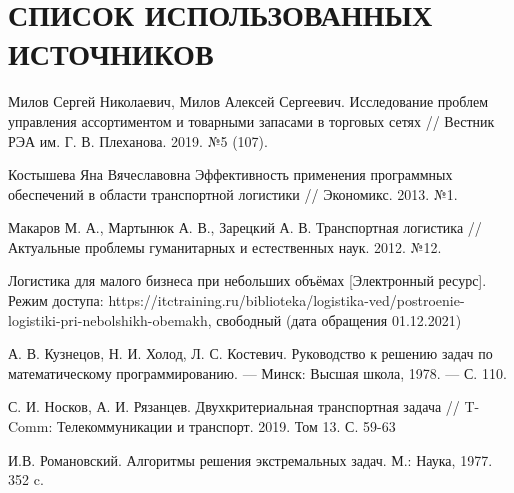 \section*{СПИСОК ИСПОЛЬЗОВАННЫХ ИСТОЧНИКОВ}

\begingroup
\renewcommand{\section}[2]{}
\begin{thebibliography}{}
	 Милов Сергей Николаевич, Милов Алексей Сергеевич. Исследование проблем управления ассортиментом и товарными запасами в торговых сетях // Вестник РЭА им. Г. В. Плеханова. 2019. №5 (107).
	
	 Костышева Яна Вячеславовна Эффективность применения программных обеспечений в области транспортной логистики // Экономикс. 2013. №1.
	
	 Макаров М. А., Мартынюк А. В., Зарецкий А. В. Транспортная логистика // Актуальные проблемы гуманитарных и естественных наук. 2012. №12.
	
	 Логистика для малого бизнеса при небольших объёмах [Электронный ресурс]. Режим доступа: https://itctraining.ru/biblioteka/logistika-ved/postroenie-logistiki-pri-nebolshikh-obemakh, свободный (дата обращения 01.12.2021)
	
	 А. В. Кузнецов, Н. И. Холод, Л. С. Костевич. Руководство к решению задач по математическому программированию. — Минск: Высшая школа, 1978. — С. 110.
	
	 С. И. Носков, А. И. Рязанцев. Двухкритериальная транспортная задача // T-Comm: Телекоммуникации и транспорт. 2019. Том 13. С. 59-63
	
	 И.В. Романовский. Алгоритмы решения экстремальных задач. М.: Наука, 1977. 352 c.
\end{thebibliography}
\endgroup

\pagebreak